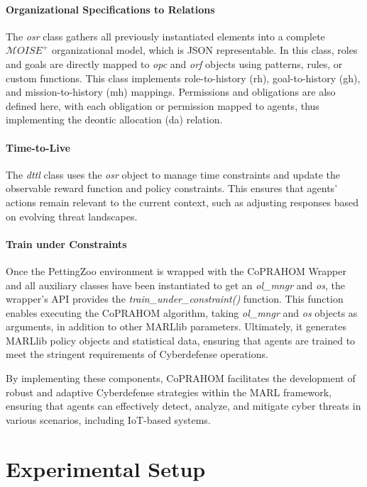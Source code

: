 \documentclass[conference]{IEEEtran}
\newcounter{relation}
\begin{document}
\paragraph{Organizational Specifications to Relations}
The \textit{osr} class gathers all previously instantiated elements into a complete $\mathcal{M}OISE^+$ organizational model, which is JSON representable. In this class, roles and goals are directly mapped to \textit{opc} and \textit{orf} objects using patterns, rules, or custom functions. This class implements role-to-history (rh), goal-to-history (gh), and mission-to-history (mh) mappings. Permissions and obligations are also defined here, with each obligation or permission mapped to agents, thus implementing the deontic allocation (da) relation.

\paragraph{Time-to-Live}
The \textit{dttl} class uses the \textit{osr} object to manage time constraints and update the observable reward function and policy constraints. This ensures that agents' actions remain relevant to the current context, such as adjusting responses based on evolving threat landscapes.

\paragraph{Train under Constraints}
Once the PettingZoo environment is wrapped with the CoPRAHOM Wrapper and all auxiliary classes have been instantiated to get an \textit{ol\_mngr} and \textit{os}, the wrapper's API provides the \textit{train\_under\_constraint()} function. This function enables executing the CoPRAHOM algorithm, taking \textit{ol\_mngr} and \textit{os} objects as arguments, in addition to other MARLlib parameters. Ultimately, it generates MARLlib policy objects and statistical data, ensuring that agents are trained to meet the stringent requirements of Cyberdefense operations.

By implementing these components, CoPRAHOM facilitates the development of robust and adaptive Cyberdefense strategies within the MARL framework, ensuring that agents can effectively detect, analyze, and mitigate cyber threats in various scenarios, including IoT-based systems.

\section{Experimental Setup}\label{sec:experimental_setup}
\end{document}
